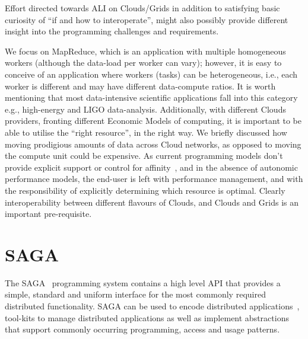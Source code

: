 \documentclass[3p,twocolumn]{elsarticle}
\newcommand{\jhanote}[1]{ {\textcolor{red} { ***SJ: #1 }}}
\newcommand{\jhanote}[1]{}
\begin{document}
Effort directed towards ALI on Clouds/Grids in addition to satisfying
basic curiosity of ``if and how to interoperate'', might also possibly
provide different insight into the programming challenges and
requirements.



We focus on MapReduce, which is an application with multiple
homogeneous workers (although the data-load per worker can vary);
however, it is easy to conceive of an application where workers
(tasks) can be heterogeneous, i.e., each worker is different and may
have different data-compute ratios.  It is worth mentioning that most
data-intensive scientific applications fall into this category e.g.,
high-energy and LIGO data-analysis.  Additionally, with different
Clouds providers, fronting different Economic Models of computing, it
is important to be able to utilise the ``right resource'', in the
right way. We briefly discussed how moving prodigious amounts of data
across Cloud networks, as opposed to moving the compute unit could be
expensive.  As current programming models don't provide explicit
support or control for affinity~\cite{jha_ccpe09}, and in the absence
of autonomic performance models, the end-user is left with performance
management, and with the responsibility of explicitly determining
which resource is optimal. Clearly interoperability between different
flavours of Clouds, and Clouds and Grids is an important
pre-requisite.


\section{SAGA}

The SAGA~\cite{saga-core} programming system contains a high level API
that provides a simple, standard and uniform interface for the most
commonly required distributed functionality.  SAGA can be used to
encode distributed applications~\cite{saga_escience07_short,
  saga_tg08}, tool-kits to manage distributed applications as well as
implement abstractions that support commonly occurring programming,
access and usage patterns.
\end{document}
